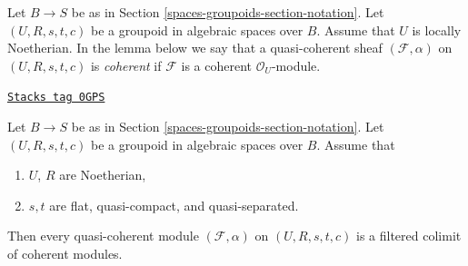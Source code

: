 Let $B \to S$ be as in Section \ref{spaces-groupoids-section-notation}.
Let $(U, R, s, t, c)$ be a groupoid in algebraic spaces over $B$.
Assume that $U$ is locally Noetherian. In the lemma below we say that a
quasi-coherent sheaf $(\mathcal{F}, \alpha)$ on $(U, R, s, t, c)$ is
{\it coherent} if $\mathcal{F}$ is a coherent $\mathcal{O}_U$-module.

\begin{lemma}
\label{spaces-groupoids-lemma-colimit-coherent}
\href{https://stacks.math.columbia.edu/tag/0GPS}{\texttt{Stacks tag 0GPS}}

Let $B \to S$ be as in Section \ref{spaces-groupoids-section-notation}.
Let $(U, R, s, t, c)$ be a groupoid in algebraic spaces over $B$.
Assume that
\begin{enumerate}
\item $U$, $R$ are Noetherian,
\item $s, t$ are flat, quasi-compact, and quasi-separated.
\end{enumerate}
Then every quasi-coherent module $(\mathcal{F}, \alpha)$ on $(U, R, s, t, c)$
is a filtered colimit of coherent modules.
\end{lemma}

